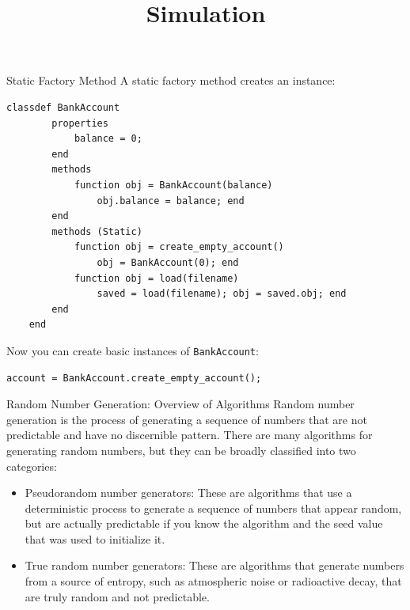 \documentclass{beamer}
\newcommand{\code}[1]{{\color{blue}\texttt{#1}}}
\begin{document}
\begin{frame}[fragile]{Static Factory Method}
    A static factory method creates an instance:
    \begin{lstlisting}[style=Matlab]
    classdef BankAccount
        properties
            balance = 0;
        end
        methods
            function obj = BankAccount(balance)
                obj.balance = balance; end
        end
        methods (Static)
            function obj = create_empty_account()
                obj = BankAccount(0); end
            function obj = load(filename)
                saved = load(filename); obj = saved.obj; end
        end
    end
    \end{lstlisting}
    Now you can create basic instances of \code{BankAccount}:
    \begin{lstlisting}[style=Matlab]
    account = BankAccount.create_empty_account();
    \end{lstlisting}
\end{frame}






\title{Simulation}
\begin{frame}
  \maketitle
\end{frame}

\begin{frame}[fragile]{Random Number Generation: Overview of Algorithms}
    Random number generation is the process of generating a sequence of numbers that are not predictable and have no discernible pattern. There are many algorithms for generating random numbers, but they can be broadly classified into two categories:
    \begin{itemize}
        \item Pseudorandom number generators: These are algorithms that use a deterministic process to generate a sequence of numbers that appear random, but are actually predictable if you know the algorithm and the seed value that was used to initialize it.
        \item True random number generators: These are algorithms that generate numbers from a source of entropy, such as atmospheric noise or radioactive decay, that are truly random and not predictable.
    \end{itemize}
\end{frame}
\end{document}
